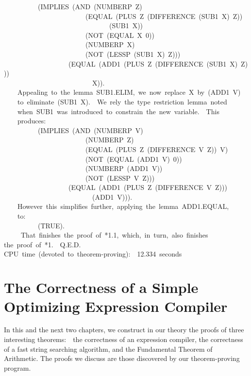 \documentclass[11pt]{book}
\newenvironment{pubasis}{\begin{flushleft}\ttfamily\small}{\normalsize\rmfamily\end{flushleft}}
\newcommand{\pubdefaulttextsize}{\large}
\begin{document}
\begin{pubasis}
~~~~~~~~~~(IMPLIES~(AND~(NUMBERP~Z)\\
~~~~~~~~~~~~~~~~~~~~~~~~(EQUAL~(PLUS~Z~(DIFFERENCE~(SUB1~X)~Z))\\
~~~~~~~~~~~~~~~~~~~~~~~~~~~~~~~(SUB1~X))\\
~~~~~~~~~~~~~~~~~~~~~~~~(NOT~(EQUAL~X~0))\\
~~~~~~~~~~~~~~~~~~~~~~~~(NUMBERP~X)\\
~~~~~~~~~~~~~~~~~~~~~~~~(NOT~(LESSP~(SUB1~X)~Z)))\\
~~~~~~~~~~~~~~~~~~~(EQUAL~(ADD1~(PLUS~Z~(DIFFERENCE~(SUB1~X)~Z)))\\
~~~~~~~~~~~~~~~~~~~~~~~~~~X)).\\

~~~~Appealing~to~the~lemma~SUB1.ELIM,~we~now~replace~X~by~(ADD1~V)\\
~~~~to~eliminate~(SUB1~X).~~We~rely~the~type~restriction~lemma~noted\\
~~~~when~SUB1~was~introduced~to~constrain~the~new~variable.~~This\\
~~~~produces:\\

~~~~~~~~~~(IMPLIES~(AND~(NUMBERP~V)\\
~~~~~~~~~~~~~~~~~~~~~~~~(NUMBERP~Z)\\
~~~~~~~~~~~~~~~~~~~~~~~~(EQUAL~(PLUS~Z~(DIFFERENCE~V~Z))~V)\\
~~~~~~~~~~~~~~~~~~~~~~~~(NOT~(EQUAL~(ADD1~V)~0))\\
~~~~~~~~~~~~~~~~~~~~~~~~(NUMBERP~(ADD1~V))\\
~~~~~~~~~~~~~~~~~~~~~~~~(NOT~(LESSP~V~Z)))\\
~~~~~~~~~~~~~~~~~~~(EQUAL~(ADD1~(PLUS~Z~(DIFFERENCE~V~Z)))\\
~~~~~~~~~~~~~~~~~~~~~~~~~~(ADD1~V))).\\

~~~~However~this~simplifies~further,~applying~the~lemma~ADD1.EQUAL,\\
~~~~to:\\

~~~~~~~~~~(TRUE).\\

~~~~~That~finishes~the~proof~of~*1.1,~which,~in~turn,~also~finishes\\
the~proof~of~*1.~~Q.E.D.\\

CPU~time~(devoted~to~theorem-proving):~~12.334~seconds\\
\end{pubasis}
\chapter{The Correctness of a Simple Optimizing Expression Compiler}
\label{SECCOMPILER}
\pubdefaulttextsize
In this and the next two chapters, we construct in our theory
the proofs of three interesting theorems:~~the correctness of an expression
compiler, the correctness of a fast string searching algorithm, and
the Fundamental Theorem of Arithmetic.  The proofs we discuss are
those discovered by our theorem-proving program.
\end{document}

